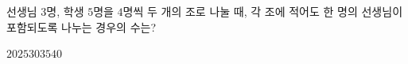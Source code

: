 \hspace*{2mm}\begin{minipage}[t]{\dimexpr\linewidth-2mm\relax}\vspace{0pt}
선생님 $3$명, 학생 $5$명을 $4$명씩 두 개의 조로 나눌 때, 각 조에 적어도 한 명의 선생님이 포함되도록 나누는 경우의 수는?
\begin{choices32}{$20$}{$25$}{$30$}{$35$}{$40$}\end{choices32}\end{minipage}
